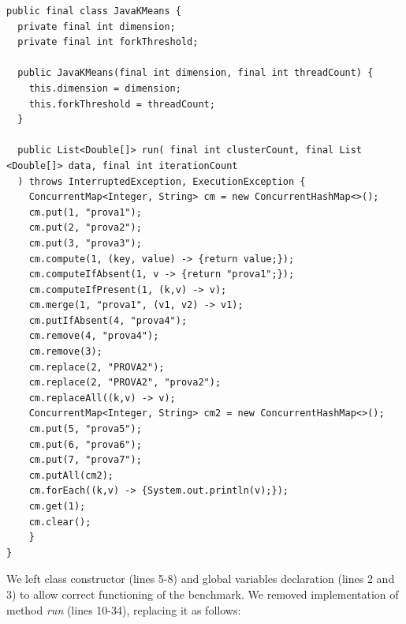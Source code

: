 \documentclass[]{usiinfthesis}
\begin{document}
\vspace*{0.25cm}
        \begin{verbatim}
public final class JavaKMeans {
  private final int dimension;
  private final int forkThreshold;

  public JavaKMeans(final int dimension, final int threadCount) {
    this.dimension = dimension;
    this.forkThreshold = threadCount;
  }

  public List<Double[]> run( final int clusterCount, final List <Double[]> data, final int iterationCount
  ) throws InterruptedException, ExecutionException {
    ConcurrentMap<Integer, String> cm = new ConcurrentHashMap<>();
    cm.put(1, "prova1");
    cm.put(2, "prova2");
    cm.put(3, "prova3");
    cm.compute(1, (key, value) -> {return value;});
    cm.computeIfAbsent(1, v -> {return "prova1";});
    cm.computeIfPresent(1, (k,v) -> v);
    cm.merge(1, "prova1", (v1, v2) -> v1);
    cm.putIfAbsent(4, "prova4");
    cm.remove(4, "prova4");
    cm.remove(3);
    cm.replace(2, "PROVA2");
    cm.replace(2, "PROVA2", "prova2");
    cm.replaceAll((k,v) -> v);
    ConcurrentMap<Integer, String> cm2 = new ConcurrentHashMap<>();
    cm.put(5, "prova5");
    cm.put(6, "prova6");
    cm.put(7, "prova7");
    cm.putAll(cm2);
    cm.forEach((k,v) -> {System.out.println(v);});
    cm.get(1);
    cm.clear();
    }
}
\end{verbatim}
\vspace*{0.25cm}
We left class constructor (lines 5-8) and global variables declaration (lines 2 and 3) to allow correct functioning of the benchmark. We removed implementation of method \textit{run} (lines 10-34), replacing it as follows:
\end{document}
